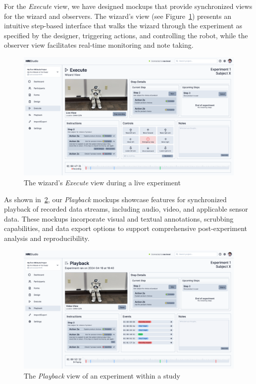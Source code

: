 \documentclass[letterpaper, 10 pt, conference]{ieeeconf}
\begin{document}
For the \emph{Execute} view, we have designed mockups that provide synchronized views for the wizard and observers. The wizard's view (see Figure~\ref{fig:execute}) presents an intuitive step-based interface that walks the wizard through the experiment as specified by the designer, triggering actions, and controlling the robot, while the observer view facilitates real-time monitoring and note taking.

\begin{figure}[h]
    \begin{center}
        \includegraphics[width=0.4\paperwidth]{assets/mockups/execute}
         \vskip -0.3cm
        \caption{The wizard's \emph{Execute} view during a live experiment}
        \label{fig:execute}
    \end{center}
    \vskip -0.5cm
\end{figure}

As shown in~\ref{fig:playback}, our \emph{Playback} mockups showcase features for synchronized playback of recorded data streams, including audio, video, and applicable sensor data. These mockups incorporate visual and textual annotations, scrubbing capabilities, and data export options to support comprehensive post-experiment analysis and reproducibility.

\begin{figure}[h]
    \begin{center}
        \includegraphics[width=0.4\paperwidth]{assets/mockups/playback}
        \vskip -0.3cm
        \caption{The \emph{Playback} view of an experiment within a study}
        \label{fig:playback}
    \end{center}
    \vskip -0.7cm
\end{figure}
\end{document}
